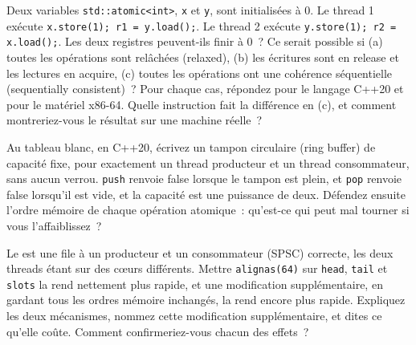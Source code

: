 \begin{question}\label{iq:iv3:low-latency:20}
Deux variables \texttt{std::atomic<int>}, \texttt{x} et \texttt{y}, sont initialisées à 0. Le thread 1 exécute \texttt{x.store(1); r1 = y.load();}. Le thread 2 exécute \texttt{y.store(1); r2 = x.load();}. Les deux registres peuvent-ils finir à 0~? Ce serait possible si (a) toutes les opérations sont relâchées (relaxed), (b) les écritures sont en release et les lectures en acquire, (c) toutes les opérations ont une cohérence séquentielle (sequentially consistent)~? Pour chaque cas, répondez pour le langage C++20 et pour le matériel x86-64. Quelle instruction fait la différence en (c), et comment montreriez-vous le résultat sur une machine réelle~?
\end{question}

\begin{question}\label{iq:iv3:low-latency:21}
Au tableau blanc, en C++20, écrivez un tampon circulaire (ring buffer) de capacité fixe, pour exactement un thread producteur et un thread consommateur, sans aucun verrou. \texttt{push} renvoie false lorsque le tampon est plein, et \texttt{pop} renvoie false lorsqu'il est vide, et la capacité est une puissance de deux. Défendez ensuite l'ordre mémoire de chaque opération atomique~: qu'est-ce qui peut mal tourner si vous l'affaiblissez~?
\end{question}

\begin{question}\label{iq:iv3:low-latency:22}
Le  est une file à un producteur et un consommateur (SPSC) correcte, les deux threads étant sur des cœurs différents. Mettre \texttt{alignas(64)} sur \texttt{head}, \texttt{tail} et \texttt{slots} la rend nettement plus rapide, et une modification supplémentaire, en gardant tous les ordres mémoire inchangés, la rend encore plus rapide. Expliquez les deux mécanismes, nommez cette modification supplémentaire, et dites ce qu'elle coûte. Comment confirmeriez-vous chacun des effets~?
\label{lst:iv3:ll:adjacent}
\end{question}

